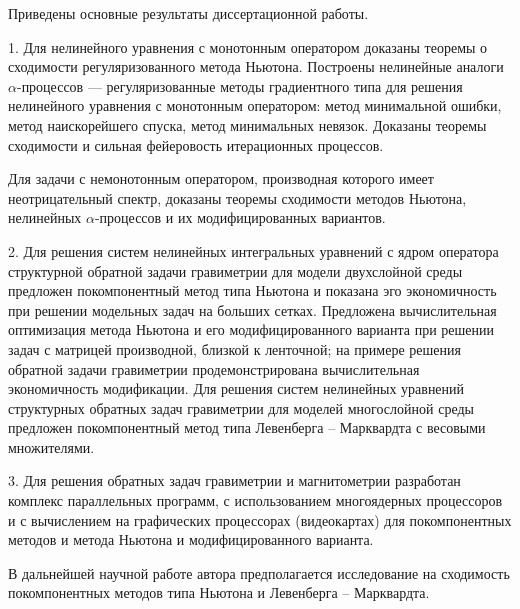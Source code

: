 \conclusion

Приведены основные результаты диссертационной работы.

1. Для нелинейного уравнения с монотонным оператором доказаны теоремы о сходимости регуляризованного метода Ньютона. Построены нелинейные аналоги $\alpha$-процессов --- регуляризованные методы градиентного типа для решения нелинейного уравнения с монотонным оператором: метод минимальной ошибки, метод наискорейшего спуска, метод минимальных невязок. Доказаны теоремы сходимости и сильная фейеровость итерационных процессов.

 Для задачи с немонотонным оператором, производная которого имеет неотрицательный спектр, доказаны теоремы сходимости методов Ньютона, нелинейных $\alpha$-процессов и их модифицированных вариантов. 

2. Для решения систем нелинейных интегральных уравнений  с ядром оператора структурной обратной задачи гравиметрии для модели двухслойной среды предложен покомпонентный метод типа Ньютона и показана эго экономичность при решении модельных задач на больших сетках. Предложена вычислительная оптимизация метода Ньютона и его модифицированного варианта при решении задач с матрицей производной, близкой к ленточной; на примере решения обратной задачи гравиметрии продемонстрирована вычислительная экономичность модификации. Для решения систем нелинейных уравнений  структурных обратных задач гравиметрии для моделей многослойной среды предложен покомпонентный метод типа Левенберга -- Марквардта с весовыми множителями.

3. Для решения обратных задач гравиметрии и магнитометрии разработан комплекс параллельных программ, с использованием многоядерных процессоров и с вычислением на графических процессорах (видеокартах) для покомпонентных методов и метода Ньютона и модифицированного варианта.

В дальнейшей научной работе автора предполагается исследование на сходимость покомпонентных методов типа Ньютона и Левенберга -- Марквардта.
